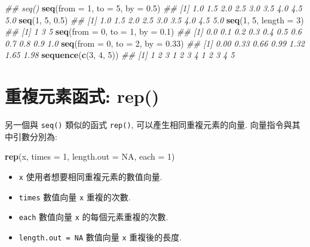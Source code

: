 \documentclass[
]{book}
\newenvironment{Shaded}{\begin{snugshade}}{\end{snugshade}}
\newcommand{\CommentTok}[1]{\textcolor[rgb]{0.56,0.35,0.01}{\textit{#1}}}
\newcommand{\DataTypeTok}[1]{\textcolor[rgb]{0.13,0.29,0.53}{#1}}
\newcommand{\DecValTok}[1]{\textcolor[rgb]{0.00,0.00,0.81}{#1}}
\newcommand{\FloatTok}[1]{\textcolor[rgb]{0.00,0.00,0.81}{#1}}
\newcommand{\KeywordTok}[1]{\textcolor[rgb]{0.13,0.29,0.53}{\textbf{#1}}}
\newcommand{\NormalTok}[1]{#1}
\newcommand{\OtherTok}[1]{\textcolor[rgb]{0.56,0.35,0.01}{#1}}
\providecommand{\tightlist}{%
  \setlength{\itemsep}{0pt}\setlength{\parskip}{0pt}}
\begin{document}
\begin{Shaded}
\begin{Highlighting}[]
\CommentTok{\#\# seq()}
\KeywordTok{seq}\NormalTok{(}\DataTypeTok{from =} \DecValTok{1}\NormalTok{, }\DataTypeTok{to =} \DecValTok{5}\NormalTok{, }\DataTypeTok{by =} \FloatTok{0.5}\NormalTok{)}
\CommentTok{\#\# [1] 1.0 1.5 2.0 2.5 3.0 3.5 4.0 4.5 5.0}
\KeywordTok{seq}\NormalTok{(}\DecValTok{1}\NormalTok{, }\DecValTok{5}\NormalTok{, }\FloatTok{0.5}\NormalTok{)}
\CommentTok{\#\# [1] 1.0 1.5 2.0 2.5 3.0 3.5 4.0 4.5 5.0}
\KeywordTok{seq}\NormalTok{(}\DecValTok{1}\NormalTok{, }\DecValTok{5}\NormalTok{, }\DataTypeTok{length =} \DecValTok{3}\NormalTok{)}
\CommentTok{\#\# [1] 1 3 5}
\KeywordTok{seq}\NormalTok{(}\DataTypeTok{from =} \DecValTok{0}\NormalTok{, }\DataTypeTok{to =} \DecValTok{1}\NormalTok{, }\DataTypeTok{by =} \FloatTok{0.1}\NormalTok{)}
\CommentTok{\#\#  [1] 0.0 0.1 0.2 0.3 0.4 0.5 0.6 0.7 0.8 0.9 1.0}
\KeywordTok{seq}\NormalTok{(}\DataTypeTok{from =} \DecValTok{0}\NormalTok{, }\DataTypeTok{to =} \DecValTok{2}\NormalTok{, }\DataTypeTok{by =} \FloatTok{0.33}\NormalTok{)}
\CommentTok{\#\# [1] 0.00 0.33 0.66 0.99 1.32 1.65 1.98}
\KeywordTok{sequence}\NormalTok{(}\KeywordTok{c}\NormalTok{(}\DecValTok{3}\NormalTok{, }\DecValTok{4}\NormalTok{, }\DecValTok{5}\NormalTok{))}
\CommentTok{\#\#  [1] 1 2 3 1 2 3 4 1 2 3 4 5}
\end{Highlighting}
\end{Shaded}

\hypertarget{ux91cdux8907ux5143ux7d20ux51fdux5f0f-rep}{%
\section{重複元素函式: rep()}\label{ux91cdux8907ux5143ux7d20ux51fdux5f0f-rep}}

另一個與
\texttt{seq()} 類似的函式
\texttt{rep()},
可以產生相同重複元素的向量. 向量指令與其中引數分別為:

\begin{Shaded}
\begin{Highlighting}[]
\KeywordTok{rep}\NormalTok{(x, }\DataTypeTok{times =} \DecValTok{1}\NormalTok{, }\DataTypeTok{length.out =} \OtherTok{NA}\NormalTok{, }\DataTypeTok{each =} \DecValTok{1}\NormalTok{)}
\end{Highlighting}
\end{Shaded}

\begin{itemize}
\tightlist
\item
  \texttt{x} 使用者想要相同重複元素的數值向量.
\item
  \texttt{times} 數值向量 \texttt{x} 重複的次數.
\item
  \texttt{each} 數值向量 \texttt{x} 的每個元素重複的次數.
\item
  \texttt{length.out\ =\ NA} 數值向量 \texttt{x} 重複後的長度.
\end{itemize}
\end{document}
